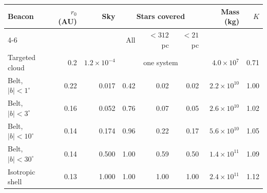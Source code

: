 \begin{tabular}{lrrrrrrr}
\toprule
Beacon & $r_0$ (AU) & Sky & \multicolumn{3}{c}{Stars covered} & Mass (kg) & $K$ \\
\cmidrule(lr){4-6}
 & & & All & $<312$~pc & $<21$~pc & & \\
\midrule
Targeted cloud & 0.2 & $1.2\times10^{-4}$ & \multicolumn{3}{c}{one system} & $4.0\times10^{7}$ & 0.71 \\
Belt, $|b| < 1^\circ$ & 0.22 & 0.017 & 0.42 & 0.02 & 0.02 & $2.2\times10^{10}$ & 1.00 \\
Belt, $|b| < 3^\circ$ & 0.16 & 0.052 & 0.76 & 0.07 & 0.05 & $2.6\times10^{10}$ & 1.02 \\
Belt, $|b| < 10^\circ$ & 0.14 & 0.174 & 0.96 & 0.22 & 0.17 & $5.6\times10^{10}$ & 1.05 \\
Belt, $|b| < 30^\circ$ & 0.14 & 0.500 & 1.00 & 0.59 & 0.50 & $1.4\times10^{11}$ & 1.09 \\
Isotropic shell & 0.13 & 1.000 & 1.00 & 1.00 & 1.00 & $2.4\times10^{11}$ & 1.12 \\
\bottomrule
\end{tabular}
